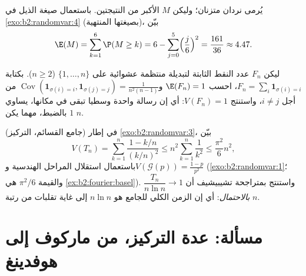 \begin{exercise}[$\star$]\label{exo:b2:randomvar:10}
يُرمى نردان متزنان؛ وليكن $M$ الأكبر من النتيجتين. باستعمال صيغة
الذيل في \cref{exo:b2:randomvar:4} (بصيغتها المنتهية)، بيّن
\[
\E(M) = \sum_{k=1}^{6}\P(M \geq k)
= 6 - \sum_{j=0}^5\Bigl(\frac j6\Bigr)^2 = \frac{161}{36}
\approx 4.47 .
\]
\end{exercise}

\begin{exercise}[$\star\star$]\label{exo:b2:randomvar:11}
ليكن $F_n$ عدد النقط الثابتة لتبديلة منتظمة عشوائية على $\{1, \dots, n\}$
($n \geq 2$). بكتابة $F_n =
\sum_i\mathbf 1_{\sigma(i) = i}$، احسب $\E(F_n) = 1$ و$\operatorname{Cov}(\mathbf 1_{\sigma(i)=i}, \mathbf
1_{\sigma(j)=j}) = \frac1{n^2(n-1)}$ من أجل $i \neq j$،
واستنتج $V(F_n) = 1$: أي إن رسالة واحدة وسطيا تبقى في مكانها، 
يساوي $1$ بالضبط، مهما يكن $n$.
\end{exercise}

\begin{exercise}[$\star\star\star$]\label{exo:b2:randomvar:12}
(جامع القسائم، التركيز) في إطار \cref{exo:b2:randomvar:3}، بيّن
\[
V(T_n) = \sum_{k=1}^n\frac{1 - k/n}{(k/n)^2}
\leq n^2\sum_{k=1}^n\frac{1}{k^2} \leq \frac{\pi^2}{6}n^2,
\]
باستعمال استقلال المراحل الهندسية و$V(\mathcal
G(p)) = \frac{1-p}{p^2}$ (\cref{exo:b2:randomvar:1}؛ والقيمة $\pi^2/6$
هي \cref{ex:b2:fourier:basel}). واستنتج بمتراجحة تشيبيشيف أن $\dfrac{T_n}{n\ln n} \to 1$ \emph{بالاحتمال}:
أي إن الزمن الكلي للجامع هو $n\ln n$ إلى غاية تقلبات من رتبة $n$.
\end{exercise}

\section{مسألة: عدة التركيز، من ماركوف إلى هوفدينغ}

